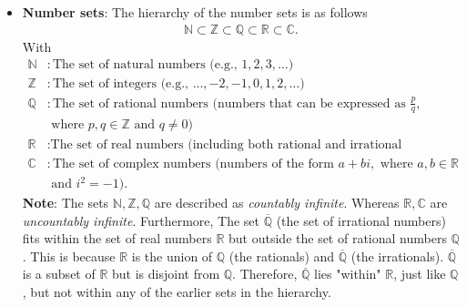 \documentclass{report}
\begin{document}
\begin{itemize}
        \item \textbf{Number sets}: The hierarchy of the number sets is as follows
            \begin{align*}
                \mathbb{N} \subset \mathbb{Z} \subset \mathbb{Q} \subset \mathbb{R} \subset \mathbb{C}
            .\end{align*}
            \bigbreak \noindent 
            With
            \begin{align*}
                \mathbb{N} & : \text{The set of natural numbers (e.g., } 1, 2, 3, \dots \text{)} \\
                \mathbb{Z} & : \text{The set of integers (e.g., } \dots, -2, -1, 0, 1, 2, \dots \text{)} \\
                \mathbb{Q} & : \text{The set of rational numbers (numbers that can be expressed as } \frac{p}{q},  \\
                           &\text{ where } p, q \in \mathbb{Z} \text{ and } q \neq 0 \text{)} \\
                \mathbb{R} & : \text{The set of real numbers (including both rational and irrational numbers)} \\
                \mathbb{C} & : \text{The set of complex numbers (numbers of the form } a + bi, \text{ where } a, b \in \mathbb{R}  \\
                           &\text{ and } i^2 = -1 \text{)}
            .\end{align*}
            \bigbreak \noindent 
            \textbf{Note}: The sets $\mathbb{N}, \mathbb{Z}, \mathbb{Q}$ are described as \textit{countably infinite}. Whereas $\mathbb{R}, \mathbb{C}$ are \textit{uncountably infinite}.
            \bigbreak \noindent 
            Furthermore, The set \(\overline{\mathbb{Q}}\) (the set of irrational numbers) fits within the set of real numbers \(\mathbb{R}\) but outside the set of rational numbers \(\mathbb{Q}\). This is because \(\mathbb{R}\) is the union of \(\mathbb{Q}\) (the rationals) and \(\overline{\mathbb{Q}}\) (the irrationals). 
            \bigbreak \noindent 
            \(\overline{\mathbb{Q}}\) is a subset of \(\mathbb{R}\) but is disjoint from \(\mathbb{Q}\). Therefore, \(\overline{\mathbb{Q}}\) lies "within" \(\mathbb{R}\), just like \(\mathbb{Q}\), but not within any of the earlier sets in the hierarchy.


\end{itemize}
\end{document}
